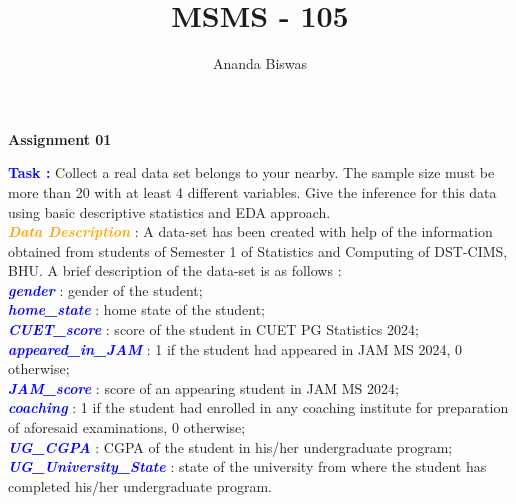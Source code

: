 \documentclass[11pt, a4paper]{article}\usepackage[]{graphicx}\usepackage[]{xcolor}
\title{MSMS - 105}
\author{Ananda Biswas}
\date{}
\begin{document}
\maketitle

\begin{center}
\textbf{Assignment 01}
\end{center}


\OrnamentDiamondSolid \hspace{0.5cm} \textcolor{blue}{\textbf{Task :}} Collect a real data set belongs to your nearby. The sample size must be more than 20 with at least 4 different variables. Give the inference for this data using basic descriptive statistics and EDA approach. \\


\faArrowAltCircleRight[regular] \textcolor{orange}{\textbf{\textit{Data Description}}} : A data-set has been created with help of the information obtained from students of Semester 1 of Statistics and Computing of DST-CIMS, BHU. A brief description of the data-set is as follows : \\

\textcolor{blue}{\textit{\textbf{gender}}} : gender of the student; \\

\textcolor{blue}{\textit{\textbf{home\_state}}} : home state of the student; \\

\textcolor{blue}{\textit{\textbf{CUET\_score}}} : score of the student in CUET PG Statistics 2024; \\

\textcolor{blue}{\textit{\textbf{appeared\_in\_JAM}}} : 1 if the student had appeared in JAM MS 2024, 0 otherwise; \\

\textcolor{blue}{\textit{\textbf{JAM\_score}}} : score of an appearing student in JAM MS 2024; \\

\textcolor{blue}{\textit{\textbf{coaching}}} : 1 if the student had enrolled in any coaching institute for preparation of aforesaid examinations, 0 otherwise; \\

\textcolor{blue}{\textit{\textbf{UG\_CGPA}}} : CGPA of the student in his/her undergraduate program; \\

\textcolor{blue}{\textit{\textbf{UG\_University\_State}}} : state of the university from where the student has completed his/her undergraduate program.
\end{document}
